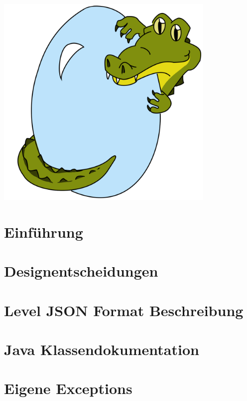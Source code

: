 \documentclass{scrreprt}
\begin{document}
\begin{titlepage}
	\begin{center}
	\includegraphics[width=300pt]{../assets/logo.png}
	\end{center}


\end{titlepage}

{}

\clearpage
\pagestyle{empty}
\tableofcontents

\clearpage
\pagestyle{plain}
\setcounter{page}{1}

\chapter{Einführung}


\chapter{Designentscheidungen}


\chapter{Level JSON Format Beschreibung}


\chapter{Java Klassendokumentation}


\chapter{Eigene Exceptions}

\end{document}
